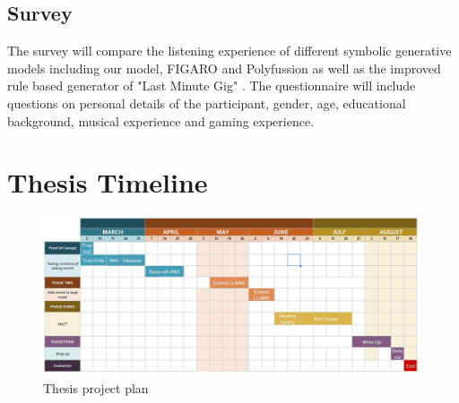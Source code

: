 \subsection{Survey}
The survey will compare the listening experience of different symbolic generative models including our model, FIGARO \cite{Rütte_figaro_2023} and Polyfussion \cite{Min_Jiang_Xia_Zhao_polyffusion_2023} as well as the improved rule based generator of "Last Minute Gig" \cite{Chalkiadakis_2022}\cite{Schlette_2022}. 
The questionnaire will include questions on personal details of the participant, gender, age, educational background, musical experience and gaming experience.

\section{Thesis Timeline}

\begin{figure}[H]
    \centering
    \includegraphics[width=1\textwidth]{IMAGES/project_plan.jpg} 
    \caption{Thesis project plan}
    \label{fig:projectplan}
\end{figure}


